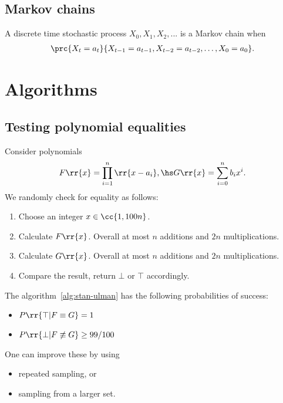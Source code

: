 \documentclass{article}
\begin{document}
\subsection{Markov chains}

\begin{definition}
  A discrete time stochastic process $X_0,X_1,X_2,...$ is a Markov chain when
  \begin{align*}
    \prc{X_t=a_t}{X_{t-1}=a_{t-1},X_{t-2}=a_{t-2},\ldots,X_0=a_0}.
  \end{align*}
\end{definition}

\section{Algorithms}
\label{sec:algorithms}

\subsection{Testing polynomial equalities}

\begin{algorithm}\label{alg:stan-ulman}
  Consider polynomials
  \begin{align*}
    F \rr{ x } = \prod_{i=1}^n \rr{ x - a_i }, \hs G \rr{ x } = \sum_{ i=0 }^{ n } b_i x^i.
  \end{align*}
  We randomly check for equality as follows:
  \begin{enumerate}
    \item Choose an integer $x\in \cc{ 1, 100n }$.
    \item Calculate $F \rr{ x }$. Overall at most $n$ additions and $2n$ multiplications.
    \item Calculate $G \rr{ x }$. Overall at most $n$ additions and $2n$ multiplications.
    \item Compare the result, return $\bot$ or $\top$ accordingly.
  \end{enumerate}
\end{algorithm}


\begin{theorem}
  \label{thm:stan-ulman-probabilities}
  The algorithm~\ref{alg:stan-ulman} has the following probabilities of success:
  \begin{itemize}
    \item $P \rr{ \top | F\equiv G } = 1$
    \item $P \rr{ \bot | F\not\equiv G } \geq 99/100$
  \end{itemize}
  One can improve these by using
  \begin{itemize}
    \item repeated sampling, or
    \item sampling from a larger set.
  \end{itemize}
\end{theorem}
\end{document}
